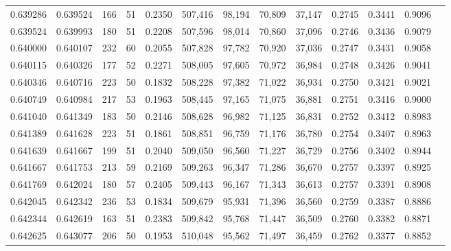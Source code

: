 \begin{tabular}{rrrrrrrrrrrrr}
0.639286 & 0.639524 &    166 &    51 &                                     0.2350 & 507,416 &  98,194 &  70,809 &  37,147 & 0.2745 & 0.3441 & 0.9096 \\
0.639524 & 0.639993 &    180 &    51 &                                     0.2208 & 507,596 &  98,014 &  70,860 &  37,096 & 0.2746 & 0.3436 & 0.9079 \\
0.640000 & 0.640107 &    232 &    60 &                                     0.2055 & 507,828 &  97,782 &  70,920 &  37,036 & 0.2747 & 0.3431 & 0.9058 \\
0.640115 & 0.640326 &    177 &    52 &                                     0.2271 & 508,005 &  97,605 &  70,972 &  36,984 & 0.2748 & 0.3426 & 0.9041 \\
0.640346 & 0.640716 &    223 &    50 &                                     0.1832 & 508,228 &  97,382 &  71,022 &  36,934 & 0.2750 & 0.3421 & 0.9021 \\
0.640749 & 0.640984 &    217 &    53 &                                     0.1963 & 508,445 &  97,165 &  71,075 &  36,881 & 0.2751 & 0.3416 & 0.9000 \\
0.641040 & 0.641349 &    183 &    50 &                                     0.2146 & 508,628 &  96,982 &  71,125 &  36,831 & 0.2752 & 0.3412 & 0.8983 \\
0.641389 & 0.641628 &    223 &    51 &                                     0.1861 & 508,851 &  96,759 &  71,176 &  36,780 & 0.2754 & 0.3407 & 0.8963 \\
0.641639 & 0.641667 &    199 &    51 &                                     0.2040 & 509,050 &  96,560 &  71,227 &  36,729 & 0.2756 & 0.3402 & 0.8944 \\
0.641667 & 0.641753 &    213 &    59 &                                     0.2169 & 509,263 &  96,347 &  71,286 &  36,670 & 0.2757 & 0.3397 & 0.8925 \\
0.641769 & 0.642024 &    180 &    57 &                                     0.2405 & 509,443 &  96,167 &  71,343 &  36,613 & 0.2757 & 0.3391 & 0.8908 \\
0.642045 & 0.642342 &    236 &    53 &                                     0.1834 & 509,679 &  95,931 &  71,396 &  36,560 & 0.2759 & 0.3387 & 0.8886 \\
0.642344 & 0.642619 &    163 &    51 &                                     0.2383 & 509,842 &  95,768 &  71,447 &  36,509 & 0.2760 & 0.3382 & 0.8871 \\
0.642625 & 0.643077 &    206 &    50 &                                     0.1953 & 510,048 &  95,562 &  71,497 &  36,459 & 0.2762 & 0.3377 & 0.8852 \\

\end{tabular}
